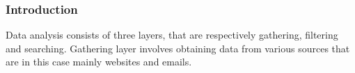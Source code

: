 \begin{frame}
    \frametitle{Introduction}
    \begin{minipage}{\textwidth}
        Data analysis consists of three layers, that are respectively gathering, filtering and searching.
        Gathering layer involves obtaining data from various sources that are in this case mainly websites and emails. 
    \end{minipage}
\end{frame} 
